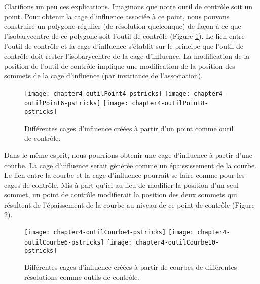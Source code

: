 Clarifions un peu ces explications. Imaginons que notre outil de contrôle soit
un point. Pour obtenir la cage d'influence associée à ce point, nous pouvons
construire un polygone régulier (de résolution quelconque) de façon à ce que
l'isobarycentre de ce polygone soit l'outil de contrôle (Figure \ref{EXTPoi}).
Le lien entre l'outil de contrôle et la cage d'influence s'établit sur le
principe que l'outil de contrôle doit rester l'isobarycentre de la cage
d'influence. La modification de la position de l'outil de contrôle implique
une modification de la position des sommets de la cage d'influence (par
invariance de l'association).

\begin{figure}[!ht]
\begin{center}
  \texttt{[image: chapter4-outilPoint4-pstricks]}
  \texttt{[image: chapter4-outilPoint6-pstricks]}
  \texttt{[image: chapter4-outilPoint8-pstricks]}

  \caption[Cages d'influence à partir d'un point] {Différentes cages
d'influence créées à partir d'un point comme outil de contrôle.}
  \label{EXTPoi}

\end{center}
\end{figure}

Dans le même esprit, nous pourrions obtenir une cage d'influence à partir
d'une courbe. La cage d'influence serait générée comme un épaississement de la
courbe. Le lien entre la courbe et la cage d'influence pourrait se faire comme
pour les cages de contrôle. Mis à part qu'ici au lieu de modifier la position
d'un seul sommet, un point de contrôle modifierait la position des deux
sommets qui résultent de l'épaissement de la courbe au niveau de ce point de
contrôle (Figure \ref{EXTCou}).

\begin{figure}[!ht]
\begin{center}
  \texttt{[image: chapter4-outilCourbe4-pstricks]}
  \texttt{[image: chapter4-outilCourbe6-pstricks]}
  \texttt{[image: chapter4-outilCourbe10-pstricks]}

  \caption[Cages d'influence à partir d'une courbe] {Différentes cages
d'influence créées à partir de courbes de différentes résolutions comme outils
de contrôle.}

  \label{EXTCou}

\end{center}
\end{figure}

